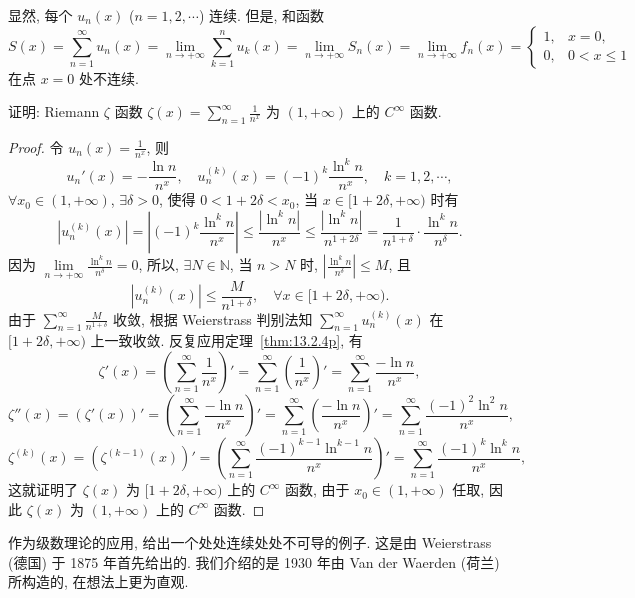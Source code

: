 显然, 每个 $u_{n}(x)$ ($n=1,2,\cdots$) 连续. 但是, 和函数
\[
  S(x)=\sum_{n=1}^{\infty}u_{n}(x)=\lim_{n\to+\infty}\sum_{k=1}^{n}u_{k}(x)=\lim_{n\to+\infty}S_{n}(x)=\lim_{n\to+\infty}f_{n}(x)=\begin{cases}
    1, & x=0,\\
    0, & 0<x\leqslant1
\end{cases}
\]
在点 $x=0$ 处不连续.

\begin{example}\label{ex:13.2.13}
证明: Riemann $\zeta$ 函数 $\zeta(x)=\sum_{n=1}^{\infty}\frac{1}{n^{x}}$ 为 $(1,+\infty)$ 上的 $C^{\infty}$ 函数.
\end{example}

\begin{proof}
令 $u_{n}(x)=\frac{1}{n^{x}}$, 则
\[
  u_{n}'(x)=-\frac{\ln n}{n^{x}},\quad u_{n}^{(k)}(x)=(-1)^{k}\frac{\ln^{k}n}{n^{x}},\quad k=1,2,\cdots,
\]
$\forall x_{0}\in(1,+\infty)$, $\exists\delta>0$, 使得 $0<1+2\delta<x_{0}$, 当 $x\in[1+2\delta,+\infty)$ 时有
\[
  |u_{n}^{(k)}(x)|=\left|(-1)^{k}\frac{\ln^{k}n}{n^{x}}\right|\leqslant\frac{|\ln^{k}n|}{n^{x}}\leqslant\frac{|\ln^{k}n|}{n^{1+2\delta}}=\frac{1}{n^{1+\delta}}\cdot\frac{\ln^{k}n}{n^{\delta}}.
\]
因为 $\lim\limits_{n\to+\infty}\frac{\ln^{k}n}{n^{\delta}}=0$, 所以, $\exists N\in\mathbb{N}$, 当 $n>N$ 时, $\left|\frac{\ln^{k}n}{n^{\delta}}\right|\leqslant M$, 且
\[
  |u_{n}^{(k)}(x)|\leqslant\frac{M}{n^{1+\delta}},\quad\forall x\in[1+2\delta,+\infty).
\]
由于 $\sum_{n=1}^{\infty}\frac{M}{n^{1+\delta}}$ 收敛, 根据 Weierstrass 判别法知 $\sum_{n=1}^{\infty}u_{n}^{(k)}(x)$ 在 $[1+2\delta,+\infty)$ 上一致收敛. 反复应用定理~\ref{thm:13.2.4p}, 有
\[
  \zeta'(x)=\left(\sum_{n=1}^{\infty}\frac{1}{n^{x}}\right)'=\sum_{n=1}^{\infty}\left(\frac{1}{n^{x}}\right)'=\sum_{n=1}^{\infty}\frac{-\ln n}{n^{x}},
\]
\[
  \zeta''(x)=(\zeta'(x))'=\left(\sum_{n=1}^{\infty}\frac{-\ln n}{n^{x}}\right)'=\sum_{n=1}^{\infty}\left(\frac{-\ln n}{n^{x}}\right)'=\sum_{n=1}^{\infty}\frac{(-1)^{2}\ln^{2}n}{n^{x}},
\]
\[
  \zeta^{(k)}(x)=\left(\zeta^{(k-1)}(x)\right)'=\left(\sum_{n=1}^{\infty}\frac{(-1)^{k-1}\ln^{k-1}n}{n^{x}}\right)'=\sum_{n=1}^{\infty}\frac{(-1)^{k}\ln^{k}n}{n^{x}},
\]
这就证明了 $\zeta(x)$ 为 $[1+2\delta,+\infty)$ 上的 $C^{\infty}$ 函数, 由于 $x_{0}\in(1,+\infty)$ 任取, 因此 $\zeta(x)$ 为 $(1,+\infty)$ 上的 $C^{\infty}$ 函数.
\end{proof}

\begin{example}[处处连续处处不可导的函数]\label{ex:13.2.14}
作为级数理论的应用, 给出一个处处连续处处不可导的例子. 这是由 Weierstrass (德国) 于 1875 年首先给出的. 我们介绍的是 1930 年由 Van der Waerden (荷兰) 所构造的, 在想法上更为直观.
\end{example}

